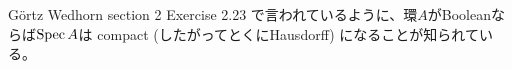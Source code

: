 
\begin{rem}
   G\"ortz Wedhorn\cite{GW} section 2 Exercise 2.23 で言われているように、環$A$がBooleanならば$\operatorname{Spec} A$は compact (したがってとくにHausdorff) になることが知られている。  
\end{rem}
